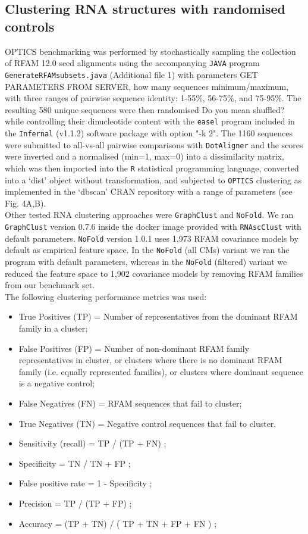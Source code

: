 \documentclass{bmcart}
\newcommand\dotaligner{\texttt{DotAligner}}
\newcommand\graphclust{\texttt{GraphClust}}
\newcommand\nofold{\texttt{NoFold}}
\begin{document}
\subsection*{Clustering RNA structures with randomised controls}
OPTICS benchmarking was performed by stochastically sampling the collection of RFAM 12.0 
seed alignments using the accompanying \texttt{JAVA} program \texttt{GenerateRFAMsubsets.java}
(Additional file 1) with parameters {\color{red} GET PARAMETERS FROM SERVER, how many sequences minimum/maximum}, 
with three ranges of pairwise sequence identity: 1-55\%, 56-75\%, and 75-95\%.  The resulting
580 unique sequences were then randomised {\color{red} Do you mean shuffled?} while controlling their dinucleotide content with 
the \texttt{easel} program included in the \texttt{Infernal} (v1.1.2) software package 
\cite{nawrocki2013infernal} with option "-k 2". The 1160 sequences were submitted to 
all-vs-all pairwise comparisons with \dotaligner{} and the scores were inverted and a 
normalised (min=1, max=0) into a dissimilarity matrix, which was then imported into
the \texttt{R} statistical programming language, converted into a `dist' object without
transformation, and subjected to \texttt{OPTICS} clustering as implemented
in the `dbscan' CRAN repository with a range of parameters (see Fig. 4A,B).\\

Other tested RNA clustering approaches were \graphclust{} and \nofold. We ran \graphclust{} version 0.7.6 inside the docker image provided with \texttt{RNAscClust} with default parameters. \nofold{} version 1.0.1 uses 1,973 RFAM covariance models by default as empirical feature space. In the \nofold{} (all CMs) variant we ran the program with default parameters, whereas in the \nofold{} (filtered) variant we reduced the feature space to 1,902 covariance models by removing RFAM families from our benchmark set. \\ 

The following clustering performance metrics was used: 
\begin{itemize}
\item True Positives (TP) = Number of representatives from the dominant RFAM family in a cluster;
\item False Positives (FP) = Number of non-dominant RFAM family representatives in cluster, or clusters
where there is no dominant RFAM family (i.e. equally represented families), or clusters where dominant sequence is a negative control;
\item False Negatives (FN) = RFAM sequences that fail to cluster; 
\item True Negatives (TN) = Negative control sequences that fail to cluster. 
\item Sensitivity (recall) = TP  / (TP + FN) ;
\item Specificity  = TN / TN + FP ;
\item False positive rate =  1 - Specificity ;
\item Precision = TP / (TP + FP) ;
\item Accuracy = (TP + TN) / ( TP + TN + FP + FN )  ; 
\end{itemize}
\end{document}

